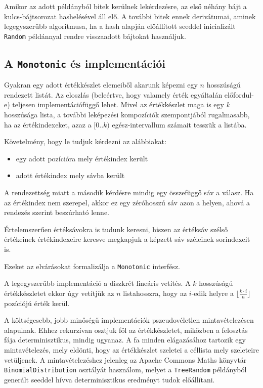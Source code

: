 \documentclass[
    parspace,
    noindent,
    nohyp,
]{elteiktdk}[2023/04/10]
\begin{document}
Amikor az adott példányból bitek kerülnek lekérdezésre,
az első néhány bájt a kulcs-bájtsorozat hashelésével áll elő.
A további bitek ennek derivátumai, aminek legegyszerűbb algoritmusa,
ha a hash alapján előállított seeddel inicializált \texttt{Random} példánnyal
rendre visszaadott bájtokat használjuk.

\subsection{A \texttt{Monotonic} és implementációi}

Gyakran egy adott értékkészlet elemeiből akarunk képezni egy $n$ hosszúságú rendezett listát.
Az eloszlás (beleértve, hogy valamely érték egyáltalán előfordul-e)
teljesen implementációfüggő lehet.
Mivel az értékkészlet maga is egy $k$ hosszúsága lista,
a további leképezési kompozíciók szempontjából rugalmasabb,
ha az értékindexeket, azaz a $[0..k)$ egész-intervallum számait tesszük a listába.

Követelmény, hogy le tudjuk kérdezni az alábbiakat:

\begin{itemize}
    \item egy adott pozícióra mely értékindex került
    \item adott értékindex mely sávba került
\end{itemize}

A rendezettség miatt a második kérdésre mindig egy összefüggő sáv a válasz. Ha az értékindex nem szerepel, akkor ez egy zéróhosszú sáv azon a helyen, ahová a rendezés szerint beszúrható lenne.

Értelemszerűen értéksávokra is tudunk keresni, hiszen az értéksáv szélső értékeinek értékindexeire keresve megkapjuk a képzett sáv széleinek sorindexeit is.

Ezeket az elvárásokat formalizálja a \texttt{Monotonic} interfész.

A legegyszerűbb implementáció a diszkrét lineáris vetítés.
A $k$ hosszúságú értékkészletet ekkor úgy vetítjük az $n$ listahosszra,
hogy az $i$-edik helyre a $\lfloor \frac{k \cdot i}{n} \rfloor$ pozíciójú érték kerül.

A költségesebb, jobb minőségű implementációk pszeudovéletlen mintavételezésen alapulnak.
Ehhez rekurzívan osztjuk föl az értékkészletet, miközben a felosztás fája determinisztikus, mindig ugyanaz.
A fa minden elágazásához tartozik egy mintavételezés, mely eldönti,
hogy az értékkészlet szeletei a céllista mely szeleteire vetüljenek.
A mintavételezéshez jelenleg az Apache Commons Maths könyvtár
\texttt{BinomialDistribution} osztályát használom,
melyet a \texttt{TreeRandom} példányból generált seeddel hívva
determinisztikus eredményt tudok előállítani.
\end{document}
